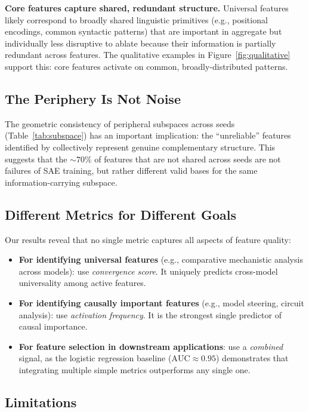 \documentclass[final]{article}
\begin{document}
\textbf{Core features capture shared, redundant structure.} Universal features likely correspond to broadly shared linguistic primitives (e.g., positional encodings, common syntactic patterns) that are important in aggregate but individually less disruptive to ablate because their information is partially redundant across features. The qualitative examples in Figure~\ref{fig:qualitative} support this: core features activate on common, broadly-distributed patterns.

\subsection{The Periphery Is Not Noise}

The geometric consistency of peripheral subspaces across seeds (Table~\ref{tab:subspace}) has an important implication: the ``unreliable'' features identified by \citet{paulo2025sparse} collectively represent genuine complementary structure. This suggests that the ${\sim}70\%$ of features that are not shared across seeds are not failures of SAE training, but rather different valid bases for the same information-carrying subspace.

\subsection{Different Metrics for Different Goals}

Our results reveal that no single metric captures all aspects of feature quality:
\begin{itemize}
    \item \textbf{For identifying universal features} (e.g., comparative mechanistic analysis across models): use \emph{convergence score}. It uniquely predicts cross-model universality among active features.
    \item \textbf{For identifying causally important features} (e.g., model steering, circuit analysis): use \emph{activation frequency}. It is the strongest single predictor of causal importance.
    \item \textbf{For feature selection in downstream applications}: use a \emph{combined} signal, as the logistic regression baseline ($\text{AUC} \approx 0.95$) demonstrates that integrating multiple simple metrics outperforms any single one.
\end{itemize}

\subsection{Limitations}
\label{sec:limitations}
\end{document}
